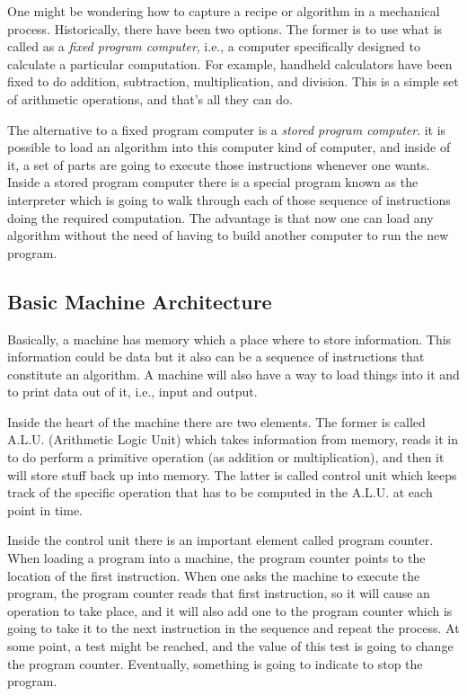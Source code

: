 \documentclass[a4paper]{article}
\begin{document}
One might be wondering how to capture a recipe or algorithm in a mechanical
process. Historically, there have been two options. The former is to use what
is called as a \textit{fixed program computer}, i.e., a computer specifically
designed to calculate a particular computation. For example, handheld
calculators have been fixed to do addition, subtraction, multiplication, and
division. This is a simple set of arithmetic operations, and that's all they
can do.

The alternative to a fixed program computer is a \textit{stored program
computer}. it is possible to load an algorithm into this computer kind of
computer, and inside of it, a set of parts are going to execute those
instructions whenever one wants. Inside a stored program computer there is a
special program known as the interpreter which is going to walk through each
of those sequence of instructions doing the required computation. The advantage
is that now one can load any algorithm without the need of having to build
another computer to run the new program.

\subsection{Basic Machine Architecture}

Basically, a machine has memory which a place where to store information.
This information could be data but it also can be a sequence of instructions
that constitute an algorithm. A machine will also have a way to load things
into it and to print data out of it, i.e., input and output.

Inside the heart of the machine there are two elements. The former is called
A.L.U. (Arithmetic Logic Unit) which takes information from memory, reads it
in to do perform a primitive operation (as addition or multiplication), and
then it will store stuff back up into memory. The latter is called control
unit which keeps track of the specific operation that has to be
computed in the A.L.U. at each point in time.

Inside the control unit there is an important element called program counter.
When loading a program into a machine, the program counter points to the
location of the first instruction. When one asks the machine to execute the
program, the program counter reads that first instruction, so it will cause an
operation to take place, and it will also add one to the program counter which
is going to take it to the next instruction in the sequence and repeat the
process. At some point, a test might be reached, and the value of this test is
going to change the program counter. Eventually, something is going to indicate
to stop the program.
\end{document}
